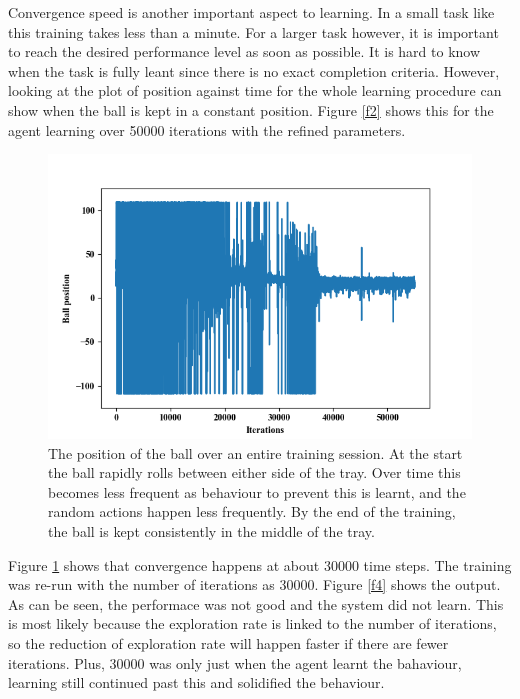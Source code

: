 \documentclass[12pt,a4paper]{article}
\begin{document}
Convergence speed is another important aspect to learning. In a small task like this training takes less than a minute. For a larger task however, it is important to reach the desired performance level as soon as possible. It is hard to know when the task is fully leant since there is no exact completion criteria. However, looking at the plot of position against time for the whole learning procedure can show when the ball is kept in a constant position. Figure \ref{f2} shows this for the agent learning over 50000 iterations with the refined parameters.
\begin{figure}[H]
	\includegraphics{153_small}
	\caption{The position of the ball over an entire training session. At the start the ball rapidly rolls between either side of the tray. Over time this becomes less frequent as behaviour to prevent this is learnt, and the random actions happen less frequently. By the end of the training, the ball is kept consistently in the middle of the tray.}
	\label{f3}
\end{figure}
Figure \ref{f3} shows that convergence happens at about 30000 time steps. The training was re-run with the number of iterations as 30000. Figure \ref{f4} shows the output. As can be seen, the performace was not good and the system did not learn. This is most likely because the exploration rate is linked to the number of iterations, so the reduction of exploration rate will happen faster if there are fewer iterations. Plus, 30000 was only just when the agent learnt the bahaviour, learning still continued past this and solidified the behaviour.
\end{document}
